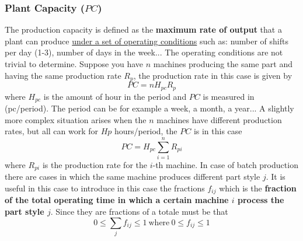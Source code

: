 \subsubsection{Plant Capacity ($PC$)}
The production capacity is defined as the \textbf{maximum rate of output} that a plant can produce \underline{under a set of operating conditions} such as: number of shifts per day (1-3), number of days in the week... The operating conditions are not trivial to determine. Suppose you have $n$ machines producing the same part and having the same production rate $R_p$, the production rate in this case is given by 
\begin{equation}
    PC={n}{H_{pc}}{R_p}
\end{equation}
where $H_{pc}$ is the amount of hour in the period and $PC$ is measured in (pc/period). The period can be for example a week, a month, a year... A slightly more complex situation arises when the $n$ machines have different production rates, but all can work for $Hp$ hours/period, the $PC$ is in this case 
\begin{equation}
    PC=H_{pc} \sum_{i=1}^n{R_{pi}}
\end{equation}
where $R_{pi}$ is the production rate for the $i$-th machine. In case of batch production there are cases in which the same machine produces different part style $j$. It is useful in this case to introduce in this case the fractions $f_{ij}$ which is the \textbf{fraction of the total operating time in which a certain machine $i$ process the part style $j$}. Since they are fractions of a totale must be that
\begin{equation}
    0 \le \sum_{j} f_{ij} \le 1 \ \text{where} \ 
    0 \le f_{ij} \le 1 
\end{equation}

